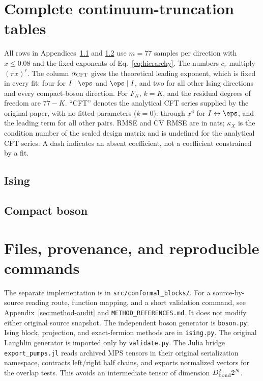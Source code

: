 \section{Complete continuum-truncation tables}
\label{sec:allfits}
All rows in Appendices~\ref{sec:ising-fit-tables} and
\ref{sec:boson-fit-tables} use $m=77$ samples per direction with $x\leq0.08$ and the fixed exponents
of Eq.~\eqref{eq:hierarchy}. The numbers $c_r$ multiply $(\pi x)^r$.
The column $\alpha_{\rm CFT}$ gives the theoretical leading exponent,
which is fixed in every fit: four for $I\mid\eps$ and $\eps\mid I$,
and two for all other Ising directions and every compact-boson direction.
For $F_K$, $k=K$, and the residual degrees of freedom are $77-K$.
``CFT'' denotes the analytical CFT series supplied by the original paper,
with no fitted parameters ($k=0$): through $x^6$ for $I\leftrightarrow\eps$,
and the leading term for all other pairs.
RMSE and CV RMSE are in nats;
$\kappa_X$ is the condition number of the scaled design matrix and is
undefined for the analytical CFT series. A dash indicates an absent coefficient,
not a coefficient constrained by a fit.

\subsection{Ising}
\label{sec:ising-fit-tables}
\begingroup\scriptsize\setlength{\tabcolsep}{3pt}

\endgroup
\subsection{Compact boson}
\label{sec:boson-fit-tables}
\begingroup\scriptsize\setlength{\tabcolsep}{3pt}

\endgroup



\section{Files, provenance, and reproducible commands}
The separate implementation is in \texttt{src/conformal\_blocks/}.
For a source-by-source reading route, function mapping, and a short
validation command, see Appendix~\ref{sec:method-audit} and
\texttt{METHOD\_REFERENCES.md}.
It does not modify either original source snapshot. The independent
boson generator is \texttt{boson.py}; Ising block, projection, and
exact-fermion methods are in \texttt{ising.py}. The original Laughlin
generator is imported only by \texttt{validate.py}. The Julia bridge
\texttt{export\_pumps.jl} reads archived MPS tensors in their original
serialization namespace, contracts left/right half chains, and exports
normalized vectors for the overlap tests. This avoids an intermediate
tensor of dimension $D_{\rm bond}^2 2^N$.

